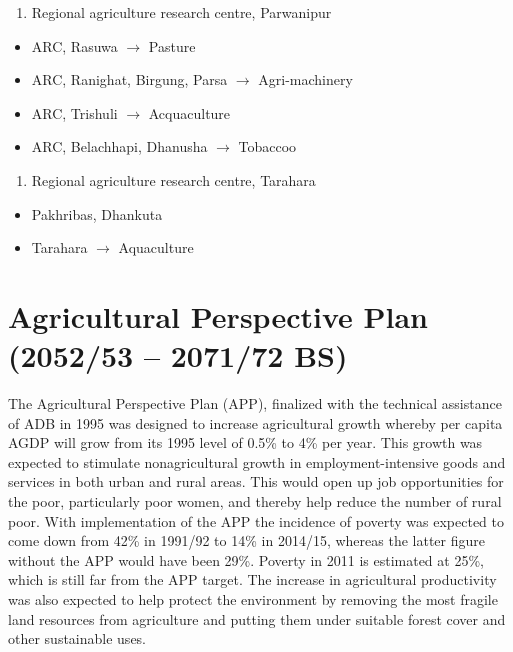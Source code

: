 \documentclass[
  openany]{book}
\providecommand{\tightlist}{%
  \setlength{\itemsep}{0pt}\setlength{\parskip}{0pt}}
\begin{document}
\begin{enumerate}
\def\labelenumi{\arabic{enumi}.}
\setcounter{enumi}{2}
\tightlist
\item
  Regional agriculture research centre, Parwanipur
\end{enumerate}

\begin{itemize}
\tightlist
\item
  ARC, Rasuwa \(\rightarrow\) Pasture
\item
  ARC, Ranighat, Birgung, Parsa \(\rightarrow\) Agri-machinery
\item
  ARC, Trishuli \(\rightarrow\) Acquaculture
\item
  ARC, Belachhapi, Dhanusha \(\rightarrow\) Tobaccoo
\end{itemize}

\begin{enumerate}
\def\labelenumi{\arabic{enumi}.}
\setcounter{enumi}{3}
\tightlist
\item
  Regional agriculture research centre, Tarahara
\end{enumerate}

\begin{itemize}
\tightlist
\item
  Pakhribas, Dhankuta
\item
  Tarahara \(\rightarrow\) Aquaculture
\end{itemize}

\hypertarget{agricultural-perspective-plan-205253-207172-bs}{%
\section{Agricultural Perspective Plan (2052/53 -- 2071/72 BS)}\label{agricultural-perspective-plan-205253-207172-bs}}

The Agricultural Perspective Plan (APP), finalized with the technical assistance of ADB in 1995 was designed to increase agricultural growth whereby per capita AGDP will grow from its 1995 level of 0.5\% to 4\% per year. This growth was expected to stimulate nonagricultural growth in employment-intensive goods and services in both urban and rural areas. This would open up job opportunities for the poor, particularly poor women, and thereby help reduce the number of rural poor. With implementation of the APP the incidence of poverty was expected to come down from 42\% in 1991/92 to 14\% in 2014/15, whereas the latter figure without the APP would have been 29\%. Poverty in 2011 is estimated at 25\%, which is still far from the APP target. The increase in agricultural productivity was also expected to help protect the environment by removing the most fragile land resources from agriculture and putting them under suitable forest cover and other sustainable uses.
\end{document}
